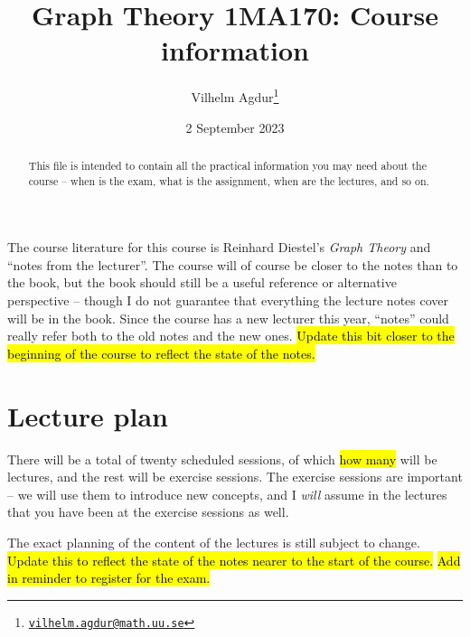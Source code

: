 \documentclass{tufte-handout}
\title{Graph Theory 1MA170: Course information}
\author[Vilhelm Agdur]{Vilhelm Agdur\thanks{\href{mailto:vilhelm.agdur@math.uu.se}{\nolinkurl{vilhelm.agdur@math.uu.se}}}}
\date{2 September 2023}
\begin{document}
\maketitle%

\begin{abstract}
\noindent
This file is intended to contain all the practical information you may need about the course -- when is the exam, what is the assignment, when are the lectures, and so on.
\end{abstract}

The course literature for this course is Reinhard Diestel's \emph{Graph Theory} and ``notes from the lecturer''. The course will of course be closer to the notes than to the book, but the book should still be a useful reference or alternative perspective -- though I do not guarantee that everything the lecture notes cover will be in the book. Since the course has a new lecturer this year, ``notes'' could really refer both to the old notes and the new ones. \hl{Update this bit closer to the beginning of the course to reflect the state of the notes.}

\section{Lecture plan}

There will be a total of twenty scheduled sessions, of which \hl{how many} will be lectures, and the rest will be exercise sessions. The exercise sessions are important -- we will use them to introduce new concepts, and I \emph{will} assume in the lectures that you have been at the exercise sessions as well.

The exact planning of the content of the lectures is still subject to change. \hl{Update this to reflect the state of the notes nearer to the start of the course.} \hl{Add in reminder to register for the exam.}
\end{document}
